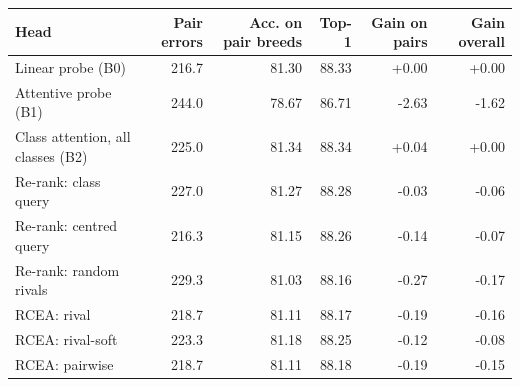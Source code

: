\begin{tabular}{lrrrrr}
\toprule
Head & Pair errors & Acc. on pair breeds & Top-1 & Gain on pairs & Gain overall \\
\midrule
Linear probe (B0) & 216.7 & 81.30 & 88.33 & +0.00 & +0.00 \\
Attentive probe (B1) & 244.0 & 78.67 & 86.71 & -2.63 & -1.62 \\
Class attention, all classes (B2) & 225.0 & 81.34 & 88.34 & +0.04 & +0.00 \\
Re-rank: class query & 227.0 & 81.27 & 88.28 & -0.03 & -0.06 \\
Re-rank: centred query & 216.3 & 81.15 & 88.26 & -0.14 & -0.07 \\
Re-rank: random rivals & 229.3 & 81.03 & 88.16 & -0.27 & -0.17 \\
RCEA: rival & 218.7 & 81.11 & 88.17 & -0.19 & -0.16 \\
RCEA: rival-soft & 223.3 & 81.18 & 88.25 & -0.12 & -0.08 \\
RCEA: pairwise & 218.7 & 81.11 & 88.18 & -0.19 & -0.15 \\
\bottomrule
\end{tabular}
